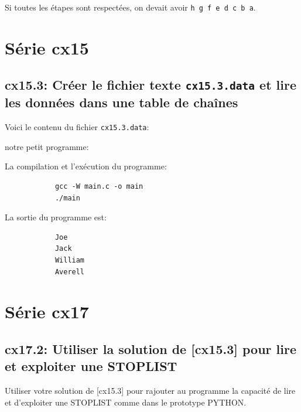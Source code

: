 \documentclass[a4paper,11pt]{article}
\begin{document}
        \bigskip
        \noindent Si toutes les étapes sont respectées, on devait avoir \texttt{h g f e d c b a}.
        
    \newpage
    \section{Série cx15}
      \subsection{cx15.3: Créer le fichier texte \texttt{cx15.3.data} et lire les données dans une table de chaînes}
        \noindent Voici le contenu du fichier \texttt{cx15.3.data}:
        

        \bigskip
        \noindent notre petit programme: 
        

        \noindent La compilation et l'exécution du programme:
        \begin{tcolorbox}[colback=lightgray!6, colframe=black, left=-20mm, right=5mm, top=2mm, bottom=-2mm, boxrule=0.1mm]
          \begin{verbatim}
            gcc -W main.c -o main
            ./main
          \end{verbatim}
        \end{tcolorbox}

        \noindent La sortie du programme est: 
        \begin{tcolorbox}[colback=lightgray!6, colframe=black, left=-20mm, right=5mm, top=2mm, bottom=-2mm, boxrule=0.1mm]
          \begin{verbatim}
            Joe
            Jack
            William
            Averell
          \end{verbatim}
        \end{tcolorbox}
        
      
    \newpage
    \section{Série cx17}
        \subsection{cx17.2: Utiliser la solution de [cx15.3] pour lire et exploiter une STOPLIST}
          \noindent Utiliser votre solution de [cx15.3] pour rajouter au programme la capacité de lire et d'exploiter
          une STOPLIST comme dans le prototype PYTHON.
\end{document}
